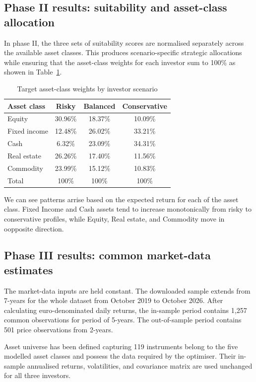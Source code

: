 \documentclass[11pt,a4paper]{article}
\begin{document}
\subsection{Phase II results: suitability and asset-class allocation}

In phase II, the three sets of suitability scores are normalised separately across the available asset classes. This produces scenario-specific strategic allocations while ensuring that the asset-class weights for each investor sum to 100\% as showen in Table~\ref{tab:scenario-asset-class-allocation}.

\begin{table}[H]
  \centering
  \caption{Target asset-class weights by investor scenario}
  \label{tab:scenario-asset-class-allocation}
  \begin{tabular}{lccc}
    \toprule
    Asset class & Risky & Balanced & Conservative \\
    \midrule
    Equity & 30.96\% & 18.37\% & 10.09\% \\
    Fixed income & 12.48\% & 26.02\% & 33.21\% \\
    Cash & 6.32\% & 23.09\% & 34.31\% \\
    Real estate & 26.26\% & 17.40\% & 11.56\% \\
    Commodity & 23.99\% & 15.12\% & 10.83\% \\
    \midrule
    Total & 100\% & 100\% & 100\% \\
    \bottomrule
  \end{tabular}
\end{table}

We can see patterns arrise based on the expected return for each of the asset class. Fixed Income and Cash assets tend to increase monotonically from risky to conservative profiles, while Equity, Real estate, and Commodity move in oopposite direction.

\subsection{Phase III results: common market-data estimates}

The market-data inputs are held constant. The downloaded sample extends from 7-years for the whole dataset from October 2019 to October 2026. After calculating euro-denominated daily returns, the in-sample period contains 1,257 common observations for period of 5-years. The out-of-sample period contains 501 price observations from 2-years.

Asset universe has been defined capturing 119 instruments belong to the five modelled asset classes and possess the data required by the optimiser. Their in-sample annualised returns, volatilities, and covariance matrix are used unchanged for all three investors.
\end{document}
